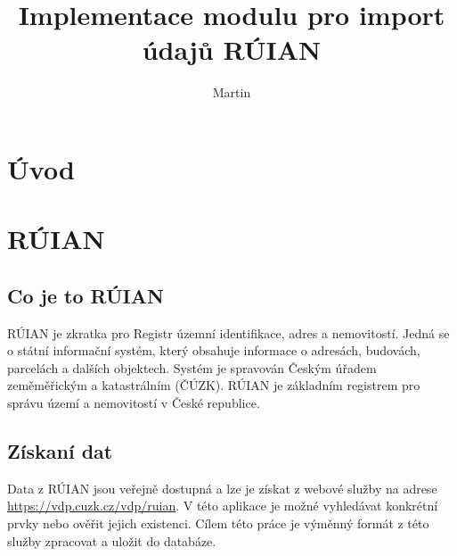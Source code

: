 \documentclass[czech, kiv, ba, he, iso690alph, pdf]{fasthesis}
\title{Implementace modulu pro import údajů RÚIAN}
\author{Martin}{Schön}
\begin{document}
\frontpages[tm]
\tableofcontents
\chapter{Úvod}

\chapter{RÚIAN}
\section{Co je to RÚIAN}
RÚIAN je zkratka pro Registr územní identifikace, adres a nemovitostí. 
Jedná se o státní informační systém, který obsahuje informace o adresách, budovách, parcelách a dalších objektech. 
Systém je spravován Českým úřadem zeměměřickým a katastrálním (ČÚZK). 
RÚIAN je základním registrem pro správu území a nemovitostí v České republice.

\section{Získaní dat}
Data z RÚIAN jsou veřejně dostupná a lze je získat z webové služby na adrese \url{https://vdp.cuzk.cz/vdp/ruian}.
V této aplikace je možné vyhledávat konkrétní prvky nebo ověřit jejich existenci.
Cílem této práce je výměnný formát z této služby zpracovat a uložit do databáze.
\end{document}
